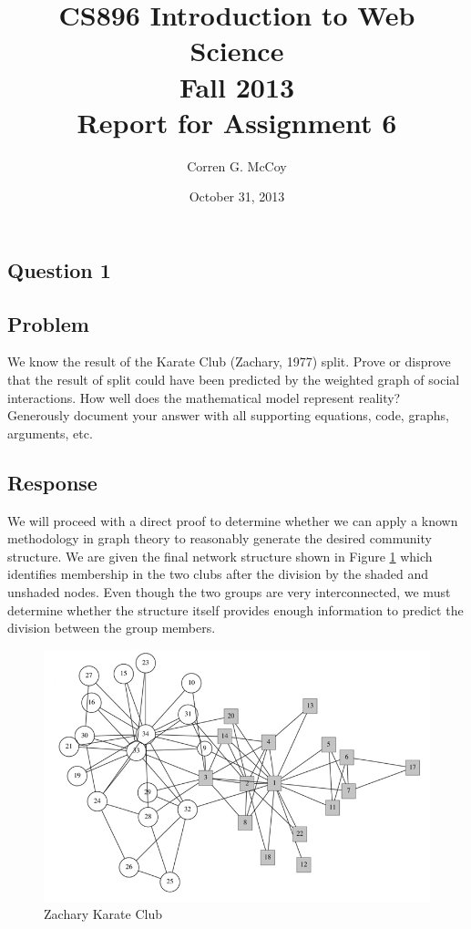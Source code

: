 \documentclass[letterpaper,11pt]{report}
\begin{document}
 
\begin{savenotes}
\pagestyle{plain}
\title{CS896 Introduction to Web Science\\Fall 2013\\Report for Assignment 6}
\author{Corren G. McCoy}
 
\date{October 31, 2013}
\maketitle

\renewcommand*\thesection{\arabic{section}}
\setcounter{section}{0}

\setcounter{tocdepth}{4}
\tableofcontents
 \listoffigures
 \listoftables
\newpage


\section{Question 1}
\subsection{Problem}We know the result of the Karate Club (Zachary, 1977)\cite{zachary1977information} split. Prove or disprove that the result of split could have been predicted by the weighted graph of social interactions. How well does the mathematical model represent reality? Generously document your answer with all supporting equations, code, graphs, arguments, etc.
\subsection{Response}We will proceed with a direct proof to determine whether we can apply a known methodology in graph theory to reasonably generate the desired community structure. We are given the final network structure shown in Figure \ref{fig:zachary} which identifies membership in the two clubs after the division by the shaded and unshaded nodes. Even though the two groups are very interconnected, we must determine whether the structure itself provides enough information to predict the division between the group members.

\begin{figure}[htbp]
	\centering
		\includegraphics[width=1.00\textwidth]{zachary.png}
	\caption{Zachary Karate Club}
	\label{fig:zachary}
\end{figure}


\end{savenotes}
\end{document}
